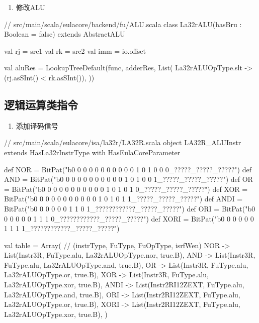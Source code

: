 \begin{enumerate}
\def\labelenumi{\arabic{enumi}.}
\setcounter{enumi}{1}
\tightlist
\item
  修改ALU
\end{enumerate}

\begin{CodeBlock}[language=BookScala]
// src/main/scala/eulacore/backend/fu/ALU.scala
class La32rALU(hasBru : Boolean = false) extends AbstractALU {

  val rj = src1
  val rk = src2
  val imm = io.offset

  val aluRes = LookupTreeDefault(func, adderRes, List(
     La32rALUOpType.slt   -> (rj.asSInt() < rk.asSInt()),
  ))
}
\end{CodeBlock}

\subsection{逻辑运算类指令}\label{sec:06-more-instructions-004}

\begin{enumerate}
\def\labelenumi{\arabic{enumi}.}
\tightlist
\item
  添加译码信号
\end{enumerate}

\begin{CodeBlock}[language=BookScala]
// src/main/scala/eulacore/isa/la32r/LA32R.scala
object LA32R_ALUInstr extends HasLa32rInstrType with HasEulaCoreParameter {
  def NOR     = BitPat("b0 0 0 0 0 0 0 0 0 0 0 1 0 1 0 0 0_?????_?????_?????")
  def AND     = BitPat("b0 0 0 0 0 0 0 0 0 0 0 1 0 1 0 0 1_?????_?????_?????")
  def OR      = BitPat("b0 0 0 0 0 0 0 0 0 0 0 1 0 1 0 1 0_?????_?????_?????")
  def XOR     = BitPat("b0 0 0 0 0 0 0 0 0 0 0 1 0 1 0 1 1_?????_?????_?????")
  def ANDI    = BitPat("b0 0 0 0 0 0 1 1 0 1_????????????_?????_?????")
  def ORI     = BitPat("b0 0 0 0 0 0 1 1 1 0_????????????_?????_?????")
  def XORI    = BitPat("b0 0 0 0 0 0 1 1 1 1_????????????_?????_?????")

  val table = Array( // (instrType, FuType, FuOpType, isrfWen)
    NOR         -> List(Instr3R, FuType.alu, La32rALUOpType.nor, true.B),
    AND         -> List(Instr3R, FuType.alu, La32rALUOpType.and, true.B),
    OR          -> List(Instr3R, FuType.alu, La32rALUOpType.or, true.B),
    XOR         -> List(Instr3R, FuType.alu, La32rALUOpType.xor, true.B),
    ANDI        -> List(Instr2RI12ZEXT, FuType.alu, La32rALUOpType.and, true.B),
    ORI         -> List(Instr2RI12ZEXT, FuType.alu, La32rALUOpType.or, true.B),
    XORI        -> List(Instr2RI12ZEXT, FuType.alu, La32rALUOpType.xor, true.B),
  )
}
\end{CodeBlock}

